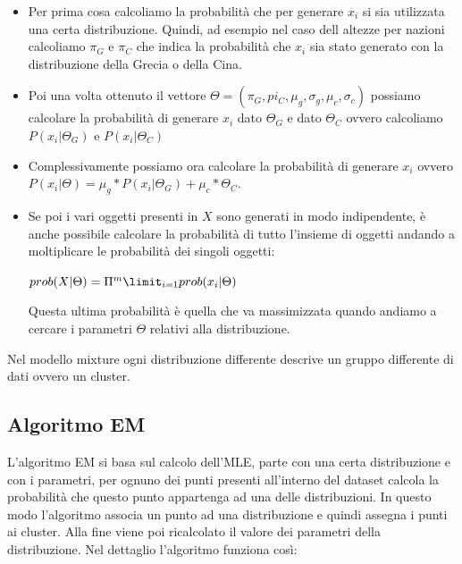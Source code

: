 \documentclass[14pt]{extreport}
\begin{document}
\begin{itemize}
    \item Per prima cosa calcoliamo la probabilità che per generare $x_i$ si sia utilizzata una certa distribuzione. Quindi, ad esempio nel caso dell altezze per nazioni calcoliamo $\pi_G$ e $\pi_C$ che indica la probabilità che $x_i$ sia stato generato con la distribuzione della Grecia o della Cina.
    \item Poi una volta ottenuto il vettore $\Theta=(\pi_G,pi_C, \mu_g,\sigma_g,\mu_c, \sigma_c)$ possiamo calcolare la probabilità di generare $x_i$ dato $\Theta_G$ e dato $\Theta_C$ ovvero calcoliamo $P(x_i|\Theta_G)$ e $P(x_i|\Theta_C)$
    \item Complessivamente possiamo ora calcolare la probabilità di generare $x_i$ ovvero $P(x_i|\Theta)=\mu_g*P(x_i|\Theta_G) + \mu_c*\Theta_C$.
    \item Se poi i vari oggetti presenti in $X$ sono generati in modo indipendente, è anche possibile calcolare la probabilità di tutto l'insieme di oggetti andando a moltiplicare le probabilità dei singoli oggetti:
    \newline
    \centerline{$prob(X|\Theta) = \Pi^m \limit_{i=1} prob(x_i|\Theta)$}
    Questa ultima probabilità è quella che va massimizzata quando andiamo a cercare i parametri $\Theta$ relativi alla distribuzione.
\end{itemize}


Nel modello mixture ogni distribuzione differente descrive un gruppo differente di dati ovvero un cluster.

\subsection{Algoritmo EM}

L'algoritmo EM si basa sul calcolo dell'MLE, parte con una certa distribuzione e con i parametri, per ognuno dei punti presenti all'interno del dataset calcola la probabilità che questo punto appartenga ad una delle distribuzioni. In questo modo l'algoritmo associa un punto ad una distribuzione e quindi assegna i punti ai cluster.
Alla fine viene poi ricalcolato il valore dei parametri della distribuzione.
Nel dettaglio l'algoritmo funziona così:
\end{document}
